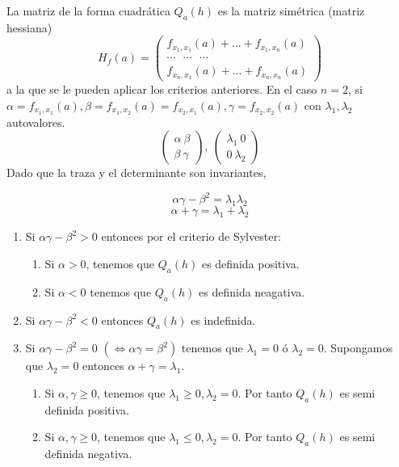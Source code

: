 \begin{ejm}
La matriz de la forma cuadrática $Q_a(h)$ es la matriz simétrica (matriz hessiana) 
\[ H_f(a) =
    \begin{pmatrix}
        f_{x_1,x_1}(a) + ... + f_{x_1,x_n}(a) \\
        \cdots \ \ \ \cdots \ \ \ \cdots\\
        f_{x_n,x_1}(a) + ... + f_{x_n,x_n}(a)
    \end{pmatrix}
\]
a la que se le pueden aplicar los criterios anteriores. En el caso $n=2$, si $\alpha = f_{x_1,x_1}(a), \beta = f_{x_1,x_2}(a) = f_{x_2,x_1}(a), \gamma = f_{x_2,x_2}(a)$ con $ \lambda_1,\lambda_2$ autovalores.
\[
    \begin{pmatrix}
        \alpha \ \beta \\
        \beta \ \gamma 
    \end{pmatrix} ,\
    \begin{pmatrix}
        \lambda_1 \ 0 \\
        0 \ \lambda_2 
    \end{pmatrix}
\]
Dado que la traza y el determinante son invariantes, 

\[\alpha\gamma - \beta^2 = \lambda_1\lambda_2\] 
\[\alpha + \gamma = \lambda_1 + \lambda_2\]

\begin{enumerate}[label=(\roman*)]
    \item  Si $\alpha\gamma - \beta^2 > 0$ entonces por el criterio de Sylvester:
    \begin{enumerate}
        \item Si $\alpha > 0$, tenemos que $Q_a(h)$ es definida positiva.
        \item Si $\alpha < 0$ tenemos que $Q_a(h)$ es definida neagativa.
    \end{enumerate}
    \item Si $\alpha\gamma - \beta^2 < 0$ entonces $Q_a(h)$ es indefinida.
    \item Si $\alpha\gamma - \beta^2 = 0$ $(\Leftrightarrow \alpha\gamma = \beta^2)$ tenemos que $\lambda_1 = 0$ ó $\lambda_2 = 0$. Supongamos que $\lambda_2 = 0$ entonces $\alpha + \gamma = \lambda_1$.
    \begin{enumerate}
        \item Si $\alpha,\gamma \geq 0$, tenemos que $\lambda_1 \geq 0, \lambda_2 = 0$. Por tanto $Q_a(h)$ es semi definida positiva.
        \item Si $\alpha,\gamma \geq 0$, tenemos que $\lambda_1 \leq 0, \lambda_2 = 0$. Por tanto $Q_a(h)$ es semi definida negativa.
    \end{enumerate}
\end{enumerate}
\end{ejm}

